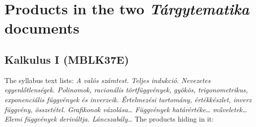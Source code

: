 \documentclass[11pt,a4paper]{article}
\theoremstyle{definition}
\begin{document}
\begin{center}
\end{center}

\section{Products in the two \emph{Tárgytematika} documents}\label{sec:syllabi}

\subsection{Kalkulus I (MBLK37E)}

The syllabus text lists: \emph{A valós számtest.  Teljes indukció.  Nevezetes
egyenlőtlenségek.  Polinomok, racionális törtfüggvények, gyökös, trigonometrikus,
exponenciális függvények és inverzeik.  Értelmezési tartomány, értékkészlet, inverz
függvény, összetétel.  Grafikonok vázolása\dots{} Függvények határértéke\dots{} műveletek\dots{}
Elemi függvények deriváltja.  Láncszabály\dots}  The products hiding in it:
\end{document}
